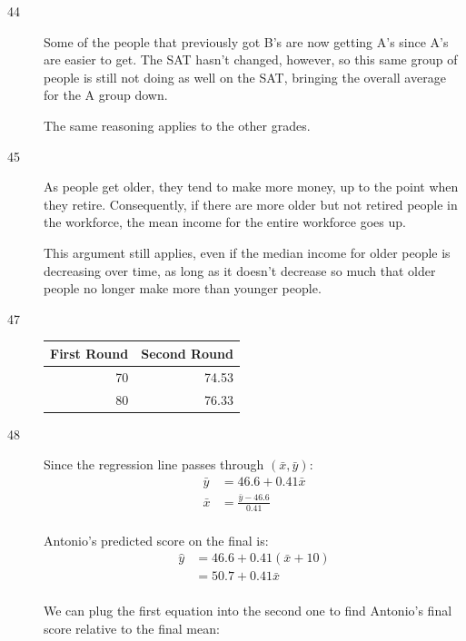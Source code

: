 \documentclass[letterpaper, landscape]{exam}
\begin{document}
\begin{description}
      \item[44]
        Some of the people that previously got B's are now getting A's since A's
        are easier to get.  The SAT hasn't changed, however, so this same group
        of people is still not doing as well on the SAT, bringing the overall
        average for the A group down.

        The same reasoning applies to the other grades.

      \item[45]
        As people get older, they tend to make more money, up to the point when
        they retire.  Consequently, if there are more older but not retired
        people in the workforce, the mean income for the entire workforce goes
        up.

        This argument still applies, even if the median income for older people
        is decreasing over time, as long as it doesn't decrease so much that
        older people no longer make more than younger people.

      \item[47]
        \begin{tabular}[H]{rr}
          \toprule
          First Round & Second Round \\
          \midrule
          70          & 74.53 \\
          80          & 76.33 \\
          \bottomrule
        \end{tabular}

      \item[48]
        Since the regression line passes through $(\bar{x}, \bar{y})$:
        \begin{align*}
          \bar{y} & = 46.6 + 0.41 \bar{x} \\
          \bar{x} & = \frac{\bar{y} - 46.6}{0.41} \\
        \end{align*}

        Antonio's predicted score on the final is:
        \begin{align*}
          \hat{y} & = 46.6 + 0.41 (\bar{x} + 10) \\
                  & = 50.7 + 0.41 \bar{x} \\
        \end{align*}

        We can plug the first equation into the second one to find Antonio's
        final score relative to the final mean:


\end{description}
\end{document}
